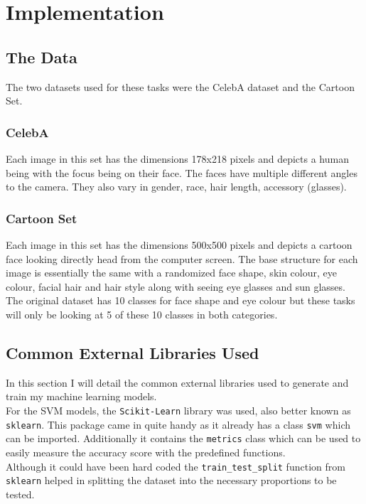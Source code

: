 \documentclass{article}
\begin{document}
\section{Implementation}
\label{sec:impl}
	\subsection{The Data}
	The two datasets used for these tasks were the CelebA dataset and the Cartoon Set.
	\subsubsection{CelebA}
	Each image in this set has the dimensions 178x218 pixels and depicts a human being with the focus being on their face. The faces have multiple different angles to the camera. They also vary in gender, race, hair length, accessory (glasses). 
	\subsubsection{Cartoon Set}
	Each image in this set has the dimensions 500x500 pixels and depicts a cartoon face looking directly head from the computer screen. The base structure for each image is essentially the same with a randomized face shape, skin colour, eye colour, facial hair and hair style along with seeing eye glasses and sun glasses. The original dataset has 10 classes for face shape and eye colour but these tasks will only be looking at 5 of these 10 classes in both categories.  
    \subsection{Common External Libraries Used}
    In this section I will detail the common external libraries used to generate and train my machine learning models.\\
    
    For the SVM models, the \verb|Scikit-Learn| library was used, also better known as \verb|sklearn|. This package came in quite handy as it already has a class \verb|svm| which can be imported. Additionally it contains the \verb|metrics| class which can be used to easily measure the accuracy score with the predefined functions.\\
    
    Although it could have been hard coded the \verb|train_test_split| function from \verb|sklearn| helped in splitting the dataset into the necessary proportions to be tested.\\
    
\end{document}
